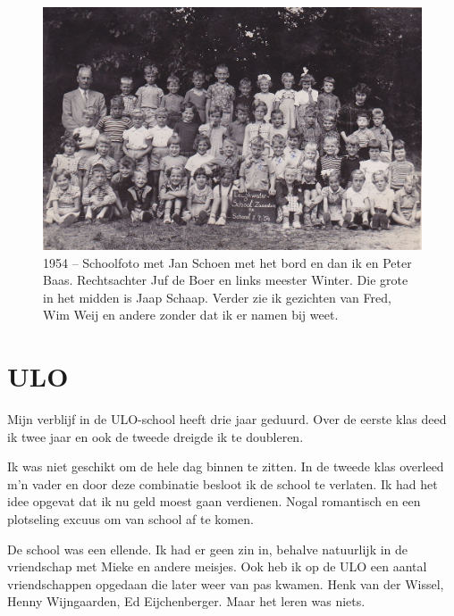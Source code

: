 \documentclass[12pt,twoside]{memoir}
\begin{document}
\begin{figure}
\includegraphics[width=\textwidth]{img/ch18/lwschool}
\caption*{\footnotesize 1954 – Schoolfoto met Jan Schoen met het bord en dan ik en Peter Baas. Rechtsachter Juf de Boer en links meester Winter. Die grote in het midden is Jaap Schaap. Verder zie ik gezichten van Fred, Wim Weij en andere zonder dat ik er namen bij weet.}
\end{figure}


\chapter{ULO} %
\label{cha:ulo}

Mijn verblijf in de ULO-school heeft drie jaar geduurd. Over de eerste klas deed ik twee jaar en ook de tweede dreigde ik te doubleren. 

Ik was niet geschikt om de hele dag binnen te zitten. In de tweede klas overleed m’n vader en door deze combinatie besloot ik de school te verlaten. Ik had het idee opgevat dat ik nu geld moest gaan verdienen. Nogal romantisch en een plotseling excuus om van school af te komen.  

De school was een ellende. Ik had er geen zin in, behalve natuurlijk in de vriendschap met Mieke en andere meisjes. Ook heb ik op de ULO een aantal vriendschappen opgedaan die later weer van pas kwamen. Henk van der Wissel, Henny Wijngaarden, Ed Eijchenberger. Maar het leren was niets. 
\end{document}
